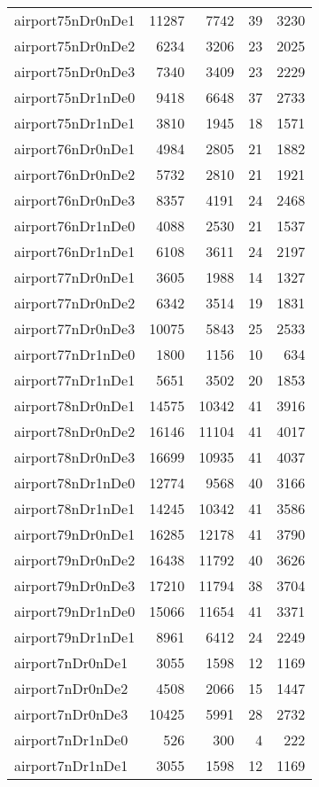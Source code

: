 \begin{longtable}{lrrrr}
airport75nDr0nDe1 & 11287 & 7742 & 39 & 3230 \\
airport75nDr0nDe2 & 6234 & 3206 & 23 & 2025 \\
airport75nDr0nDe3 & 7340 & 3409 & 23 & 2229 \\
airport75nDr1nDe0 & 9418 & 6648 & 37 & 2733 \\
airport75nDr1nDe1 & 3810 & 1945 & 18 & 1571 \\
airport76nDr0nDe1 & 4984 & 2805 & 21 & 1882 \\
airport76nDr0nDe2 & 5732 & 2810 & 21 & 1921 \\
airport76nDr0nDe3 & 8357 & 4191 & 24 & 2468 \\
airport76nDr1nDe0 & 4088 & 2530 & 21 & 1537 \\
airport76nDr1nDe1 & 6108 & 3611 & 24 & 2197 \\
airport77nDr0nDe1 & 3605 & 1988 & 14 & 1327 \\
airport77nDr0nDe2 & 6342 & 3514 & 19 & 1831 \\
airport77nDr0nDe3 & 10075 & 5843 & 25 & 2533 \\
airport77nDr1nDe0 & 1800 & 1156 & 10 & 634 \\
airport77nDr1nDe1 & 5651 & 3502 & 20 & 1853 \\
airport78nDr0nDe1 & 14575 & 10342 & 41 & 3916 \\
airport78nDr0nDe2 & 16146 & 11104 & 41 & 4017 \\
airport78nDr0nDe3 & 16699 & 10935 & 41 & 4037 \\
airport78nDr1nDe0 & 12774 & 9568 & 40 & 3166 \\
airport78nDr1nDe1 & 14245 & 10342 & 41 & 3586 \\
airport79nDr0nDe1 & 16285 & 12178 & 41 & 3790 \\
airport79nDr0nDe2 & 16438 & 11792 & 40 & 3626 \\
airport79nDr0nDe3 & 17210 & 11794 & 38 & 3704 \\
airport79nDr1nDe0 & 15066 & 11654 & 41 & 3371 \\
airport79nDr1nDe1 & 8961 & 6412 & 24 & 2249 \\
airport7nDr0nDe1 & 3055 & 1598 & 12 & 1169 \\
airport7nDr0nDe2 & 4508 & 2066 & 15 & 1447 \\
airport7nDr0nDe3 & 10425 & 5991 & 28 & 2732 \\
airport7nDr1nDe0 & 526 & 300 & 4 & 222 \\
airport7nDr1nDe1 & 3055 & 1598 & 12 & 1169 \\

\end{longtable}
